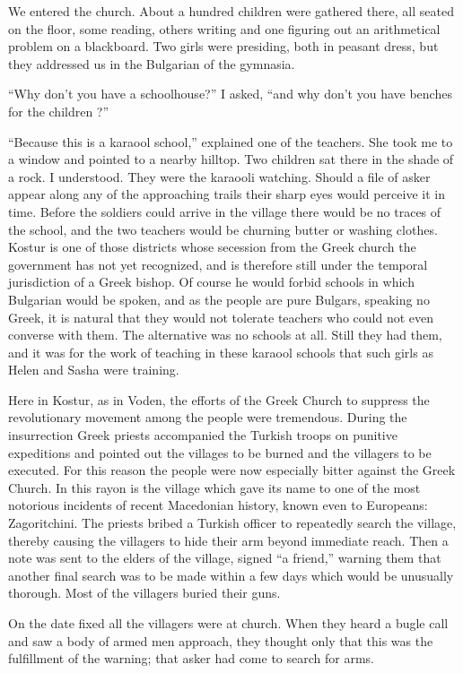 \documentclass[a5paper,12pt]{book}
\begin{document}
We entered the church. About a hundred children were gathered there, all seated on the floor, some reading, others writing and one figuring out an arithmetical problem on a blackboard. Two girls were presiding, both in peasant dress, but they addressed us in the Bulgarian of the gymnasia.

“Why don’t you have a schoolhouse?” I asked, “and why don’t you have benches for the children ?”

“Because this is a karaool school,” explained one of the teachers. She took me to a window and pointed to a nearby hilltop. Two children sat there in the shade of a rock. I understood. They were the karaooli watching. Should a file of asker appear along any of the approaching trails their sharp eyes would perceive it in time. Before the soldiers could arrive in the village there would be no traces of the school, and the two teachers would be churning butter or washing clothes. Kostur is one of those districts whose secession from the Greek church the government has not yet recognized, and is therefore still under the temporal jurisdiction of a Greek bishop. Of course he would forbid schools in which Bulgarian would be spoken, and as the people are pure Bulgars, speaking no Greek, it is natural that they would not tolerate teachers who could not even converse with them. The alternative was no schools at all. Still they had them, and it was for the work of teaching in these karaool schools that such girls as Helen and Sasha were training.

Here in Kostur, as in Voden, the efforts of the Greek Church to suppress the revolutionary movement among the people were tremendous. During the insurrection Greek priests accompanied the Turkish troops on punitive expeditions and pointed out the villages to be burned and the villagers to be executed. For this reason the people were now especially bitter against the Greek Church. In this rayon is the village which gave its name to one of the most notorious incidents of recent Macedonian history, known even to Europeans: Zagoritchini. The priests bribed a Turkish officer to repeatedly search the village, thereby causing the villagers to hide their arm beyond immediate reach. Then a note was sent to the elders of the village, signed “a friend,” warning them that another final search was to be made within a few days which would be unusually thorough. Most of the villagers buried their guns.

On the date fixed all the villagers were at church. When they heard a bugle call and saw a body of armed men approach, they thought only that this was the fulfillment of the warning; that asker had come to search for arms.
\end{document}
